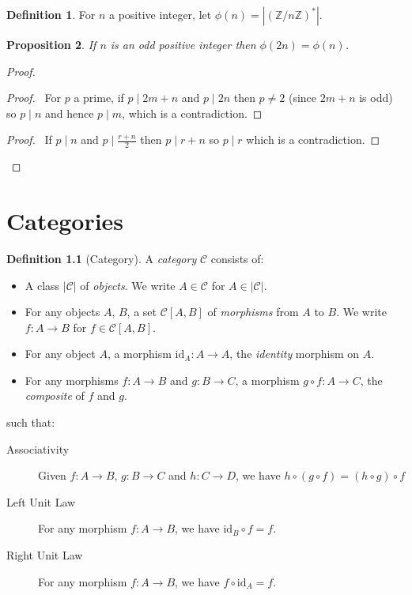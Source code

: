 \documentclass{book}
\let\qed\relax
\newtheorem{prop}{Proposition}[chapter]
\theoremstyle{definition}
\newtheorem{df}[prop]{Definition}
\newcommand{\id}[1]{\ensuremath{\mathrm{id}_{#1}}}
\begin{document}
\begin{df}
    For $n$ a positive integer, let $\phi(n) = |(\mathbb{Z} / n \mathbb{Z})^*|$.
\end{df}

\begin{prop}
    If $n$ is an odd positive integer then $\phi(2n) = \phi(n)$.
\end{prop}

\begin{proof}
    \pf
    \begin{proof}
        \pf\ For $p$ a prime, if $p \mid 2m+n$ and $p \mid 2n$ then $p \neq 2$ (since $2m+n$ is odd) so $p \mid n$ and hence $p \mid m$, which is a contradiction.
    \end{proof}
    \begin{proof}
        \pf\ If $p \mid n$ and $p \mid \frac{r + n}{2}$ then $p \mid r + n$ so $p \mid r$ which is a contradiction.
    \end{proof}
    \qed
\end{proof}

\chapter{Categories}

\begin{df}[Category]
    A \emph{category} $\mathcal{C}$ consists of:
    \begin{itemize}
        \item A class $|\mathcal{C}|$ of \emph{objects}. We write $A \in \mathcal{C}$ for $A \in |\mathcal{C}|$.
        \item For any objects $A$, $B$, a set $\mathcal{C}[A,B]$ of \emph{morphisms} from $A$ to $B$. We write $f : A \rightarrow B$ for $f \in \mathcal{C}[A,B]$.
        \item For any object $A$, a morphism $\id{A} : A \rightarrow A$, the \emph{identity} morphism on $A$.
        \item For any morphisms $f : A \rightarrow B$ and $g : B \rightarrow C$, a morphism $g \circ f : A \rightarrow C$, the \emph{composite} of $f$ and $g$.
    \end{itemize}
    such that:
    \begin{description}
        \item[Associativity] Given $f : A \rightarrow B$, $g : B \rightarrow C$ and $h : C \rightarrow D$, we have $h \circ (g \circ f) = (h \circ g) \circ f$
        \item[Left Unit Law] For any morphism $f : A \rightarrow B$, we have $\id{B} \circ f = f$.
        \item[Right Unit Law] For any morphism $f : A \rightarrow B$, we have $f \circ \id{A} = f$.
    \end{description}
\end{df}
\end{document}
